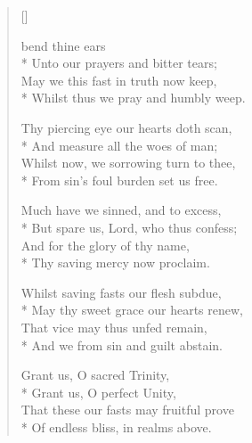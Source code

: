 \newHymn


\begin{verse}[\versewidth]

 bend thine ears\\*
Unto our prayers and bitter tears; \\
May we this fast in truth now keep, \\*
Whilst thus we pray and humbly weep. 

	Thy piercing eye our hearts doth scan, \\*
And measure all the woes of man; \\
Whilst now, we sorrowing turn to thee,\\* 
From sin’s foul burden set us free. 

	Much have we sinned, and to excess, \\*
But spare us, Lord, who thus confess; \\
And for the glory of thy name, \\*
Thy saving mercy now proclaim. 

	Whilst saving fasts our flesh subdue,\\* 
May thy sweet grace our hearts renew, \\
That vice may thus unfed remain, \\*
And we from sin and guilt abstain. 

	Grant us, O sacred Trinity, \\*
Grant us, O perfect Unity, \\
That these our fasts may fruitful prove \\*
Of endless bliss, in realms above. 
\end{verse}



